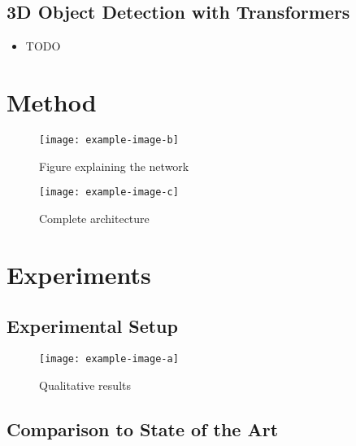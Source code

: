 \documentclass[letterpaper, 10 pt, conference]{ieeeconf}  %
\begin{document}
\lightlipsum[1-3]

\subsection{3D Object Detection with Transformers}

\begin{itemize}
    \item TODO
\end{itemize}

\lightlipsum[1]

\section{Method}

\lightlipsum[1-4]

\begin{figure}[htbp]
    \centering
    \texttt{[image: example-image-b]}
    \caption{Figure explaining the network}
    \label{fig:b}
\end{figure}

\begin{figure*}[h]
    \centering
    \texttt{[image: example-image-c]}
    \caption{Complete architecture}
    \label{fig:c}
\end{figure*}

\lightlipsum[1-12]

\section{Experiments}

\lightlipsum[1]

\subsection{Experimental Setup}

\lightlipsum[1]

\begin{figure}[htbp]
    \centering
    \texttt{[image: example-image-a]}
    \caption{Qualitative results}
    \label{fig:e}
\end{figure}

\subsection{Comparison to State of the Art}
\end{document}
